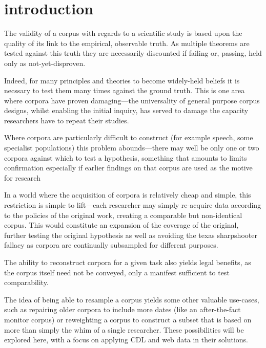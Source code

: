 
\section{introduction}
The validity of a corpus with regards to a scientific study is based upon the quality of its link to the empirical, observable truth.  As multiple theorems are tested against this truth they are necessarily discounted if failing or, passing, held only as not-yet-disproven.

Indeed, for many principles and theories to become widely-held beliefs it is necssary to test them many times against the ground truth.  This is one area where corpora have proven damaging---the universality of general purpose corpus designs, whilst enabling the initial inquiry, has served to damage the capacity researchers have to repeat their studies.


Where corpora are particularly difficult to construct (for example speech, some specialist populations) this problem abounds---there may well be only one or two corpora against which to test a hypothesis, something that amounts to limits confirmation especially if earlier findings on that corpus are used as the motive for research 

In a world where the acquisition of corpora is relatively cheap and simple, this restriction is simple to lift---each researcher may simply re-acquire data according to the policies of the original work, creating a comparable but non-identical corpus.  This would constitute an expansion of the coverage of the original, further testing the original hypothesis as well as avoiding the texas sharpshooter fallacy as corpora are continually subsampled for different purposes.

The ability to reconstruct corpora for a given task also yields legal benefits, as the corpus itself need not be conveyed, only a manifest sufficient to test comparability. 



The idea of being able to resample a corpus yields some other valuable use-cases, such as repairing older corpora to include more dates (like an after-the-fact monitor corpus) or reweighting a corpus to construct a subset that is based on more than simply the whim of a single researcher.  These possibilities will be explored here, with a focus on applying CDL and web data in their solutions.




